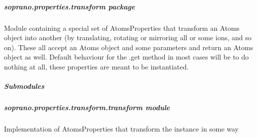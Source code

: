 \documentclass[letterpaper,10pt,english]{sphinxmanual}
\begin{document}
\begin{fulllineitems}
\begin{fulllineitems}
\label{doctree/soprano.properties.symmetry.symmetry:soprano.properties.symmetry.symmetry.SymmetryDataset.default_name}
\end{fulllineitems}


\begin{fulllineitems}
\label{doctree/soprano.properties.symmetry.symmetry:soprano.properties.symmetry.symmetry.SymmetryDataset.default_params}
\end{fulllineitems}


\begin{fulllineitems}
\label{doctree/soprano.properties.symmetry.symmetry:soprano.properties.symmetry.symmetry.SymmetryDataset.extract}
\end{fulllineitems}


\end{fulllineitems}



\subparagraph{soprano.properties.transform package}
\label{doctree/soprano.properties.transform:soprano-properties-transform-package}\label{doctree/soprano.properties.transform::doc}\label{doctree/soprano.properties.transform:module-soprano.properties.transform}
Module containing  a special set of AtomsProperties that transform an Atoms
object into another (by translating, rotating or mirroring all or some ions,
and so on). These all accept an Atoms object and some parameters and return
an Atoms object as well. Default behaviour for the .get method in most cases
will be to do nothing at all, these properties are meant to be instantiated.


\subparagraph{Submodules}
\label{doctree/soprano.properties.transform:submodules}

\subparagraph{soprano.properties.transform.transform module}
\label{doctree/soprano.properties.transform.transform:soprano-properties-transform-transform-module}\label{doctree/soprano.properties.transform.transform::doc}\label{doctree/soprano.properties.transform.transform:module-soprano.properties.transform.transform}
Implementation of AtomsProperties that transform the instance in some
way
\end{document}
